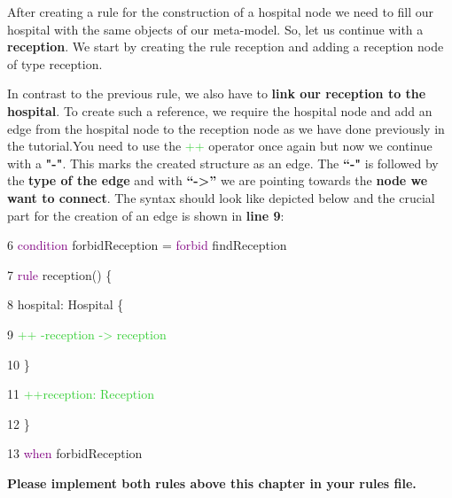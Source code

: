 After creating a rule for the construction of a hospital node we need to fill our hospital with the same objects of our meta-model. So, let us continue with a \textbf{reception}. We start by creating the rule \textsf{reception} and adding a reception node of type reception.\newline

In contrast to the previous rule, we also have to \textbf{link our reception to the hospital}. To create such a reference, we require the hospital node and add an edge from the hospital node to the reception node as we have done previously in the tutorial.\newline You need to use the \textcolor{LimeGreen}{++} operator once again but now we continue with a \textbf{"-"}. This marks the created structure as an edge. The \textbf{“-"} is followed by the \textbf{type of the edge} and with \textbf{“->”} we are pointing towards the \textbf{node we want to connect}.\newline
The syntax should look like depicted below and the crucial part for the creation of an edge is shown in \textbf{line 9}:\newline

{

6 \hspace{0.5cm}\textcolor{Purple}{condition} forbidReception = \textcolor{Purple}{forbid} findReception

7 \hspace{0.5cm}\textcolor{Purple}{rule} reception() \{

8 \hspace{1cm}     hospital: Hospital \{

9 \hspace{1.5cm}       \textcolor{LimeGreen}{++ -reception -> reception}

10 \hspace{1.5cm}	 \}

11 \hspace{0.5cm}	 \textcolor{LimeGreen}{++reception: Reception}

12 \hspace{0.5cm}\}

13 \hspace{0.5cm}\textcolor{Purple}{when} forbidReception \newline

}

\textbf{Please implement both rules above this chapter in your rules file.}\newline

